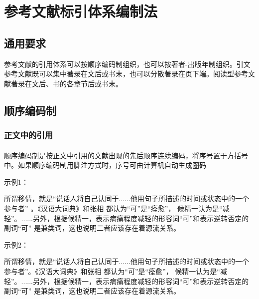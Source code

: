 \documentclass{article}
\begin{document}
\newpage
\appendix


\section{参考文献标引体系编制法}

\subsection{通用要求}

参考文献的引用体系可以按顺序编码制组织，也可以按著者-出版年制组织。引文参考文献既可以集中著录在文后或书末，也可以分散著录在页下端。阅读型参考文献著录在文后、书的各章节后或书末。

\subsection{顺序编码制}

\subsubsection{正文中的引用}

\paragraph{} 顺序编码制是按正文中引用的文献出现的先后顺序连续编码，将序号置于方括号中。如果顺序编码制用脚注方式时，序号可由计算机自动生成圈码



\begin{refsection}
示例1：

所谓移情，就是“说话人将自己认同于......他用句子所描述的时间或状态中的一个参与者”
\cite{Sunstein1996-903-903}。《汉语大词典》和张相
\cite{Morri2010--}都认为“可”是“痊愈”，
候精一认为是“减轻”\cite{罗杰斯2011-15-16}。......另外，根据候精一，表示病痛程度减轻的形容词“可”和表示逆转否定的副词“可”
是兼类词\cite{陈登原2000-29-29}，这也说明二者应该存在着源流关系。

示例2：

所谓移情，就是“说话人将自己认同于......他用句子所描述的时间或状态中的一个参与者”。《汉语大词典》和张相
都认为“可”是“痊愈”，
候精一认为是“减轻”。......另外，根据候精一，表示病痛程度减轻的形容词“可”和表示逆转否定的副词“可”
是兼类词，这也说明二者应该存在着源流关系。


\end{refsection}
\end{document}
